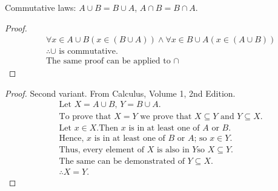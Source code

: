 \begin{question}
  Commutative laws: $A \cup B = B \cup A$, $A \cap B = B \cap A$.
\end{question}
\begin{proof}
  \begin{align*}
    & \forall x \in A \cup B (x \in (B \cup A)) \land \forall x \in B \cup A (x \in (A \cup B)) \\
    & \therefore \cup \text{ is commutative.} \\
    & \text{The same proof can be applied to } \cap
  \end{align*}
\end{proof}
\begin{proof}
  Second variant. From Calculus, Volume 1, 2nd Edition.
  \begin{align*}
    & \text{Let } X = A \cup B \text{, } Y = B \cup A. \\
    & \text{To prove that } X = Y \text{ we prove that } X \subseteq Y \text{ and } Y \subseteq X. \\
    & \text{Let } x \in X. \text{Then } x \text{ is in at least one of } A \text{ or } B. \\
    & \text{Hence, } x \text{ is in at least one of } B \text{ or } A \text{; so } x \in Y. \\
    & \text{Thus, every element of } X \text{ is also in } Y \text{so } X \subseteq Y. \\
    & \text{The same can be demonstrated of } Y \subseteq X. \\
    & \therefore X = Y.
  \end{align*}
\end{proof}

